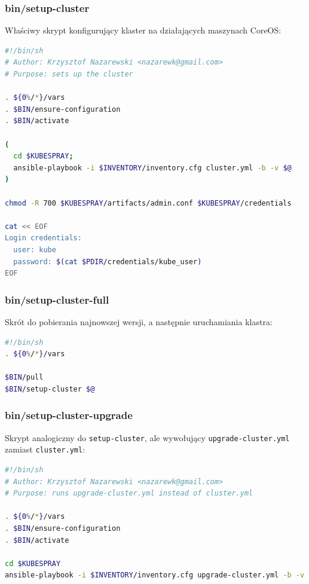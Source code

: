 \documentclass[a4paper,12pt,twoside,openany]{report}
\newcommand{\passthrough}[1]{#1}
\begin{document}
\hypertarget{binsetup-cluster}{%
\subsubsection{bin/setup-cluster}\label{binsetup-cluster}}

Właściwy skrypt konfigurujący klaster na działających maszynach CoreOS:

\begin{lstlisting}[language=bash]
#!/bin/sh
# Author: Krzysztof Nazarewski <nazarewk@gmail.com>
# Purpose: sets up the cluster

. ${0%/*}/vars
. $BIN/ensure-configuration
. $BIN/activate

(
  cd $KUBESPRAY;
  ansible-playbook -i $INVENTORY/inventory.cfg cluster.yml -b -v $@
)

chmod -R 700 $KUBESPRAY/artifacts/admin.conf $KUBESPRAY/credentials

cat << EOF
Login credentials:
  user: kube
  password: $(cat $PDIR/credentials/kube_user)
EOF
\end{lstlisting}

\hypertarget{binsetup-cluster-full}{%
\subsubsection{bin/setup-cluster-full}\label{binsetup-cluster-full}}

Skrót do pobierania najnowszej wersji, a następnie uruchamiania klastra:

\begin{lstlisting}[language=bash]
#!/bin/sh
. ${0%/*}/vars

$BIN/pull
$BIN/setup-cluster $@
\end{lstlisting}

\hypertarget{binsetup-cluster-upgrade}{%
\subsubsection{bin/setup-cluster-upgrade}\label{binsetup-cluster-upgrade}}

Skrypt analogiczny do \passthrough{\lstinline!setup-cluster!}, ale
wywołujący \passthrough{\lstinline!upgrade-cluster.yml!} zamiast
\passthrough{\lstinline!cluster.yml!}:

\begin{lstlisting}[language=bash]
#!/bin/sh
# Author: Krzysztof Nazarewski <nazarewk@gmail.com>
# Purpose: runs upgrade-cluster.yml instead of cluster.yml

. ${0%/*}/vars
. $BIN/ensure-configuration
. $BIN/activate

cd $KUBESPRAY
ansible-playbook -i $INVENTORY/inventory.cfg upgrade-cluster.yml -b -v $@
\end{lstlisting}
\end{document}
